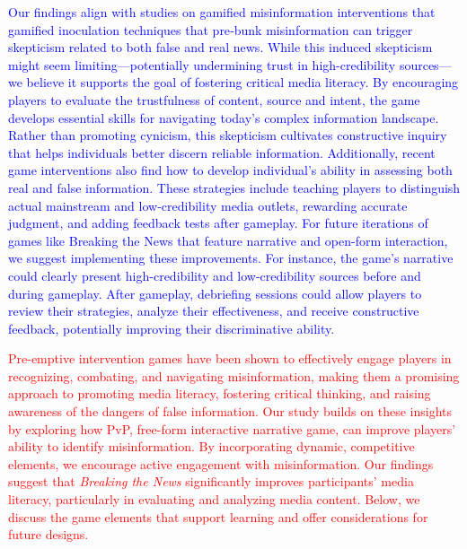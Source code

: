 \textcolor{blue}{Our findings align with studies on gamified misinformation interventions that gamified inoculation techniques that pre‐bunk misinformation can trigger skepticism related to both false and real news\cite{hameleers2023intended,modirrousta2023gamified}. While this induced skepticism might seem limiting—potentially undermining trust in high-credibility sources—we believe it supports the goal of fostering critical media literacy. By encouraging players to evaluate the trustfulness of content, source and intent,  the game develops essential skills for navigating today's complex information landscape. Rather than promoting cynicism, this skepticism cultivates constructive inquiry that helps individuals better discern reliable information. Additionally, recent game interventions also find how to develop individual's ability in assessing both real and false information. These strategies include teaching players to distinguish actual mainstream and low-credibility media outlets\cite{micallef2021fakey}, rewarding accurate judgment\cite{barzilai2023misinformation}, and adding feedback tests after gameplay\cite{leder2024feedback}. For future iterations of games like Breaking the News that feature narrative and open-form interaction, we suggest implementing these improvements. For instance, the game's narrative could clearly present high-credibility and low-credibility sources before and during gameplay. After gameplay, debriefing sessions could allow players to review their strategies, analyze their effectiveness, and receive constructive feedback, potentially improving their discriminative ability.}

\textcolor{red}{Pre-emptive intervention games have been shown to effectively engage players in recognizing, combating, and navigating misinformation, making them a promising approach to promoting media literacy, fostering critical thinking, and raising awareness of the dangers of false information\cite{roozenbeek2019fake,micallef2021fakey,clever2020fakeyou,katsaounidou2019mathe,escapefake,tang2024mystery}. Our study builds on these insights by exploring how PvP, free-form interactive narrative game, can improve players' ability to identify misinformation. By incorporating dynamic, competitive elements, we encourage active engagement with misinformation. Our findings suggest that \textit{Breaking the News} significantly improves participants' media literacy, particularly in evaluating and analyzing media content. Below, we discuss the game elements that support learning and offer considerations for future designs.}

